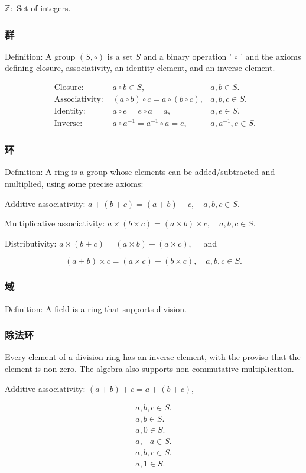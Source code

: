 $\mathbb{Z}:$ Set of integers.

\subsubsection*{群}
Definition: A group $(S, \circ)$ is a set $S$ and a binary operation ' $\circ$ ' and the axioms defining closure, associativity, an identity element, and an inverse element.

$$
\begin{array}{rlr}
\text { Closure: } & a \circ b \in S, & a, b \in S . \\
\text { Associativity: } & (a \circ b) \circ c=a \circ(b \circ c), & a, b, c \in S . \\
\text { Identity: } & a \circ e=e \circ a=a, & a, e \in S . \\
\text { Inverse: } & a \circ a^{-1}=a^{-1} \circ a=e, & a, a^{-1}, e \in S .
\end{array}
$$

\subsubsection*{环}
Definition: A ring is a group whose elements can be added/subtracted and multiplied, using some precise axioms:

Additive associativity: $a+(b+c)=(a+b)+c, \quad a, b, c \in S$.

Multiplicative associativity: $a \times(b \times c)=(a \times b) \times c, \quad a, b, c \in S$.

Distributivity: $a \times(b+c)=(a \times b)+(a \times c), \quad$ and

$$
(a+b) \times c=(a \times c)+(b \times c), \quad a, b, c \in S .
$$

\subsubsection*{域}
Definition: A field is a ring that supports division.

\subsubsection*{除法环}
Every element of a division ring has an inverse element, with the proviso that the element is non-zero. The algebra also supports non-commutative multiplication.

Additive associativity: $(a+b)+c=a+(b+c)$,

$$
\begin{array}{r}
a, b, c \in S . \\
a, b \in S . \\
a, 0 \in S . \\
a,-a \in S . \\
a, b, c \in S . \\
a, 1 \in S .
\end{array}
$$

